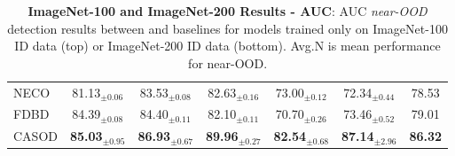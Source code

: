 \begin{table}[t!]
{\begin{tabular}{|l|ccccc|c|}
NECO\cite{ammar2024neco}   & 81.13$_{\pm 0.06}$ & 83.53$_{\pm 0.08}$ & 82.63$_{\pm 0.16}$ & 73.00$_{\pm 0.12}$ & 72.34$_{\pm 0.44}$ & 78.53 \\
FDBD\cite{liu2024fast}   & 84.39$_{\pm 0.08}$ & 84.40$_{\pm 0.11}$ & 82.10$_{\pm 0.11}$ & 70.70$_{\pm 0.26}$ & 73.46$_{\pm 0.52}$ & 79.01 \\ \hline
CASOD  & \textbf{85.03}$_{\pm 0.95}$ & \textbf{86.93}$_{\pm 0.67}$ & \textbf{89.96}$_{\pm 0.27}$ & \textbf{82.54}$_{\pm 0.68}$ & \textbf{87.14}$_{\pm 2.96}$ & \textbf{86.32}  \\ \hline
		\end{tabular}
	}
	\caption{\textbf{ImageNet-100 and ImageNet-200 Results - AUC}: AUC \textit{near-OOD} detection results between \sys and baselines for models trained only on ImageNet-100 ID data (top) or ImageNet-200 ID data (bottom). Avg.N is mean performance for near-OOD. %
    }
	\label{tab:table_ood_auc}
\end{table}

